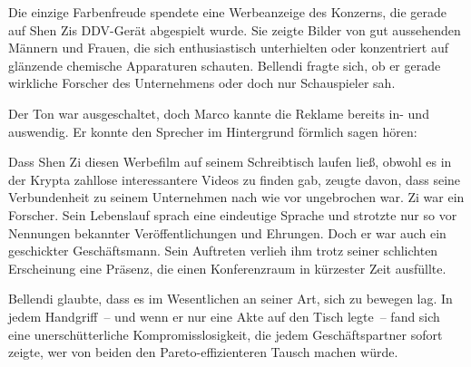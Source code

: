 \par

Die einzige Farbenfreude spendete eine Werbeanzeige des Konzerns, die gerade auf Shen Zis DDV-Gerät abgespielt wurde. Sie zeigte Bilder von gut aussehenden Männern und Frauen, die sich enthusiastisch unterhielten oder konzentriert auf glänzende chemische Apparaturen schauten. Bellendi fragte sich, ob er gerade wirkliche Forscher des Unternehmens oder doch nur Schauspieler sah.

\par

Der Ton war ausgeschaltet, doch Marco kannte die Reklame bereits in- und auswendig. Er konnte den Sprecher im Hintergrund förmlich sagen hören: 

\par

Dass Shen Zi diesen Werbefilm auf seinem Schreibtisch laufen ließ, obwohl es in der Krypta zahllose interessantere Videos zu finden gab, zeugte davon, dass seine Verbundenheit zu seinem Unternehmen nach wie vor ungebrochen war. Zi war ein Forscher. Sein Lebenslauf sprach eine eindeutige Sprache und strotzte nur so vor Nennungen bekannter Veröffentlichungen und Ehrungen. Doch er war auch ein geschickter Geschäftsmann. Sein Auftreten verlieh ihm trotz seiner schlichten Erscheinung eine Präsenz, die einen Konferenzraum in kürzester Zeit ausfüllte.

\par

Bellendi glaubte, dass es im Wesentlichen an seiner Art, sich zu bewegen lag. In jedem Handgriff~-- und wenn er nur eine Akte auf den Tisch legte~-- fand sich eine unerschütterliche Kompromisslosigkeit, die jedem Geschäftspartner sofort zeigte, wer von beiden den Pareto-effizienteren Tausch machen würde.

\par

